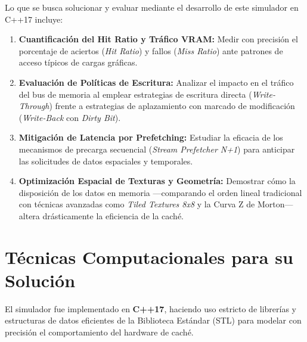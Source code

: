 \documentclass[12pt,letterpaper]{article}
\begin{document}
Lo que se busca solucionar y evaluar mediante el desarrollo de este simulador en C++17 incluye:
\begin{enumerate}
    \item \textbf{Cuantificación del Hit Ratio y Tráfico VRAM:} Medir con precisión el porcentaje de aciertos (\textit{Hit Ratio}) y fallos (\textit{Miss Ratio}) ante patrones de acceso típicos de cargas gráficas.
    \item \textbf{Evaluación de Políticas de Escritura:} Analizar el impacto en el tráfico del bus de memoria al emplear estrategias de escritura directa (\textit{Write-Through}) frente a estrategias de aplazamiento con marcado de modificación (\textit{Write-Back} con \textit{Dirty Bit}).
    \item \textbf{Mitigación de Latencia por Prefetching:} Estudiar la eficacia de los mecanismos de precarga secuencial (\textit{Stream Prefetcher N+1}) para anticipar las solicitudes de datos espaciales y temporales.
    \item \textbf{Optimización Espacial de Texturas y Geometría:} Demostrar cómo la disposición de los datos en memoria —comparando el orden lineal tradicional con técnicas avanzadas como \textit{Tiled Textures 8x8} y la Curva Z de Morton— altera drásticamente la eficiencia de la caché.
\end{enumerate}

\section{\color{UCBlue}Técnicas Computacionales para su Solución}

El simulador fue implementado en \textbf{C++17}, haciendo uso estricto de librerías y estructuras de datos eficientes de la Biblioteca Estándar (STL) para modelar con precisión el comportamiento del hardware de caché.
\end{document}
